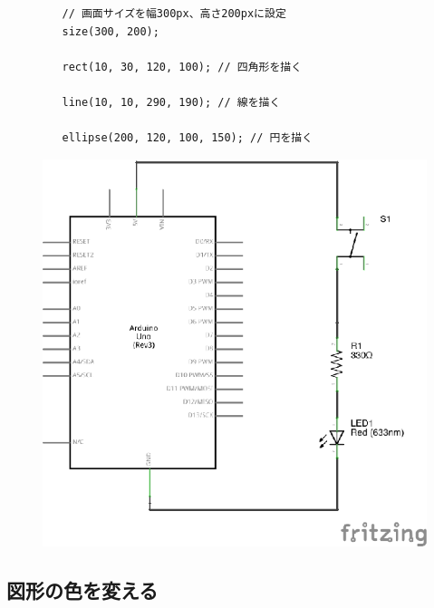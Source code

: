 \documentclass[11pt,a4paper]{jarticle}
\begin{document}
\begin{figure}[h!]
 \begin{minipage}{0.65\columnwidth}
  \begin{lstlisting}
   // 画面サイズを幅300px、高さ200pxに設定
   size(300, 200);

   rect(10, 30, 120, 100); // 四角形を描く

   line(10, 10, 290, 190); // 線を描く

   ellipse(200, 120, 100, 150); // 円を描く
  \end{lstlisting}  
 \end{minipage}
 \begin{minipage}{0.35\columnwidth}
  \centering
  \includegraphics[width=0.5\columnwidth]{img/circuit01.eps}
 \end{minipage}
\end{figure}


\subsection*{図形の色を変える}
\end{document}
